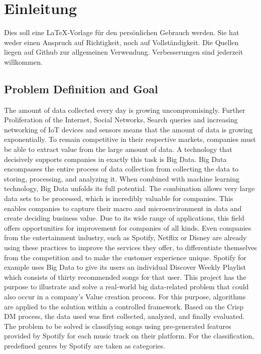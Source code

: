 \section{Einleitung}
Dies soll eine \LaTeX{}-Vorlage für den persönlichen Gebrauch werden. Sie hat weder einen Anspruch auf Richtigkeit, noch auf Vollständigkeit. Die Quellen liegen auf Github zur allgemeinen Verwendung. Verbesserungen sind jederzeit willkommen.

\subsection{Problem Definition and Goal}
The amount of data collected every day is growing uncompromisingly. Further Proliferation of the Internet, Social Networks, 
Search queries and increasing networking of IoT devices and sensors means that the amount of data is growing exponentially. 
To remain competitive in their respective markets, companies must be able to extract value from the large amount of data.
 A technology that decisively supports companies in exactly this task is Big Data. Big Data encompasses the entire process of data collection from collecting the data to storing, 
 processing, and analyzing it. When combined with machine learning technology, Big Data unfolds its full potential. The combination allows very large data sets to be processed, 
 which is incredibly valuable for companies. This enables companies to capture their macro and microenvironment in data and create deciding business value. 
 Due to its wide range of applications, this field offers opportunities for improvement for companies of all kinds. 
 Even companies from the entertainment industry, such as Spotify, Netflix or Disney are already using these practices to improve the services they offer, 
 to differentiate themselves from the competition and to make the customer experience unique. 
 Spotify for example uses Big Data to give its users an individual Discover Weekly Playlist which consists of thirty recommended songs for that user. 
 This project has the purpose to illustrate and solve a real-world big data-related problem that could also occur in a company's Value creation process. 
 For this purpose, algorithms are applied to the solution within a controlled framework. Based on the Crisp DM process, the data used was first collected, analyzed, 
 and finally evaluated. The problem to be solved is classifying songs using pre-generated features provided by Spotify for each music track on their platform. 
 For the classification, predefined genres by Spotify are taken as categories.

